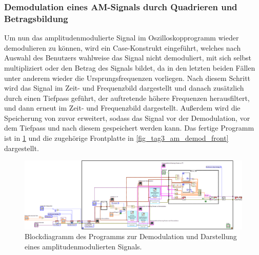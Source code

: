 \documentclass[
a4paper,
12pt,
pagesize,
ngerman
]{scrartcl}
\begin{document}

	\subsubsection{Demodulation eines AM-Signals durch Quadrieren und Betragsbildung} \label{DemodulationAM}
	Um nun das amplitudenmodulierte Signal im Oszilloskopprogramm wieder demodulieren zu können, wird ein Case-Konstrukt eingeführt, welches nach Auswahl des Benutzers wahlweise das Signal nicht demoduliert, mit sich selbst multipliziert oder den Betrag des Signals bildet, da in den letzten beiden Fällen unter anderem wieder die Ursprungsfrequenzen vorliegen.
	Nach diesem Schritt wird das Signal im Zeit- und Frequenzbild dargestellt und danach zusätzlich durch einen Tiefpass geführt, der auftretende höhere Frequenzen herausfiltert, und dann erneut im Zeit- und Frequenzbild dargestellt.
	Außerdem wird die Speicherung von zuvor erweitert, sodass das Signal vor der Demodulation, vor dem Tiefpass und nach diesem gespeichert werden kann.
	Das fertige Programm ist in \cref{fig_tag3_am_demod_block} und die zugehörige Frontplatte in \cref{fig_tag3_am_demod_front} dargestellt.

	\begin{figure}[H]  
	\includegraphics[width=1\textwidth]{EIRE2018Dateien/Tag3/modifizierterOszi/Oszilloskop__modifiziertd}
	\centering
	\caption{
		Blockdiagramm des Programms zur Demodulation und Darstellung eines amplitudenmodulierten Signals.
	}
	\label{fig_tag3_am_demod_block}
	\centering
\end{figure}
\end{document}
